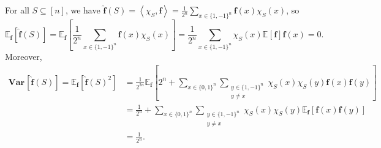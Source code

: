 \documentclass[12pt]{article}
\newcommand{\bitset}{\{0,1\}}
\newcommand{\fbitset}{\{1,-1\}}
\newcommand{\E}[2][]{\mathbb E_{#1}\left[#2\right]}
\newcommand{\Var}[2]{\mathbf{Var}_{#1}\left[#2\right]}
\newcommand{\eqn}[1]{\begin{equation*}#1\end{equation*}}
\newcommand{\hf}{\widehat{f}}
\newcommand{\sumx}{\sum_{x \in \bitset^n}}
\newcommand{\sumxf}{\sum_{x \in \fbitset^n}}
\newcommand{\sumS}{\sum_{S \subseteq [n]}}
\renewcommand{\ip}[1]{\left\langle#1\right\rangle}
\begin{document}
\subsection{}

\subsection{}
For all $S \subseteq [n]$, we have $\hat{\mathbf{f}}(S) = \ip{\chi_S,\mathbf{f}} = \frac1{2^n}\sumxf\mathbf{f}(x) \chi_S(x)$, so 
\eqn{\E[\mathbf{f}]{\hat{\mathbf{f}}(S)} = \E[\mathbf{f}]{\frac1{2^n}\sumxf \mathbf{f}(x) \chi_S(x)} = \frac1{2^n}\sumxf\chi_S(x) \E{\mathbf{f}}{\mathbf{f}(x)} = 0.}
Moreover,
\begin{align*}
    \Var{}{\mathbf{\hf}(S)} = \E[\mathbf{f}]{\mathbf{\hat{f}}(S)^2} &= \frac1{2^{2n}}\E[\mathbf{f}]{2^n + \sumx \sum_{\substack{y \in \fbitset^n\\ y \neq x}} \chi_S(x) \chi_S(y) \mathbf{f}(x) \mathbf{f}(y)}\\
    &= \frac1{2^n} + \sumx \sum_{\substack{y \in \fbitset^n\\ y \neq x}} \chi_S(x) \chi_S(y) \E[\mathbf{f}]{\mathbf{f}(x) \mathbf{f}(y)}\\
    &= \frac1{2^n}.
\end{align*}

\subsection{}

\subsection{}

\subsection{}

\subsection{}

\subsection{}
\end{document}
